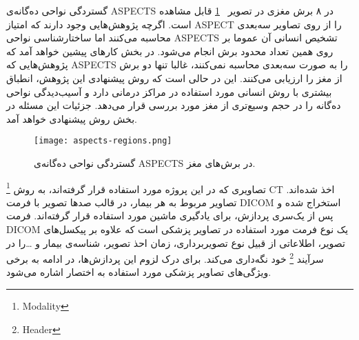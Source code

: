 گستردگی نواحی ده‌گانه‌ی ASPECTS در ۸ برش مغزی در تصویر ~\ref{fig:aspects-slices} قابل مشاهده است.
اگرچه پژوهش‌هایی وجود دارند که امتیاز ASPECT را از روی تصاویر سه‌بعدی محاسبه می‌کنند اما 
ساختارشناسی نواحی ASPECTS تشخیص انسانی آن عموما بر روی همین تعداد محدود برش انجام می‌شود.
در بخش کارهای پیشین خواهد آمد که پژوهش‌هایی که ASPECTS را به صورت سه‌بعدی محاسبه نمی‌کنند، غالبا تنها دو برش از مغز را ارزیابی می‌کنند.
این در حالی است که روش پیشنهادی این پژوهش، انطباق بیشتری با روش انسانی مورد استفاده در مراکز درمانی دارد و 
آسیب‌دیدگی نواحی ده‌گانه را در حجم وسیع‌تری از مغز مورد بررسی قرار می‌دهد. جزئیات این مسئله در بخش روش پیشنهادی خواهد آمد.

\begin{figure}[ht]
\centering
\texttt{[image: aspects-regions.png]}
\caption[]{گستردگی نواحی ده‌گانه‌ی ASPECTS در برش‌های مغز.}
\label{fig:aspects-slices}
\end{figure}


تصاویری که در این پروژه مورد استفاده قرار گرفته‌اند، به روش
\footnote{Modality}
 CT اخذ شده‌اند.
تصاویر مربوط به هر بیمار، در قالب صدها تصویر با فرمت DICOM استخراج شده و پس از یک‌سری پردازش، برای یادگیری ماشین مورد استفاده قرار گرفته‌اند.
فرمت DICOM یک نوع فرمت مورد استفاده در تصاویر پزشکی است که علاوه بر پیکسل‌های تصویر، اطلاعاتی از قبیل نوع تصویربرداری، زمان احذ تصویر، شناسه‌ی بیمار و \dots را در سرآیند
\footnote{Header}
خود نگه‌داری می‌کند.
برای درک لزوم این پردازش‌ها، در ادامه به برخی ویژگی‌های تصاویر پزشکی مورد استفاده به اختصار اشاره می‌شود.

